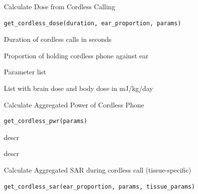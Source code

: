 \documentclass[a4paper]{book}
\begin{document}
%
\begin{Description}
Calculate Dose from Cordless Calling
\end{Description}
%
\begin{Usage}
\begin{verbatim}
get_cordless_dose(duration, ear_proportion, params)
\end{verbatim}
\end{Usage}
%
\begin{Arguments}
\begin{ldescription}
\item[\code{duration}] Duration of cordless calls in seconds

\item[\code{ear\_proportion}] Proportion of holding cordless phone against ear

\item[\code{params}] Parameter list
\end{ldescription}
\end{Arguments}
%
\begin{Value}
List with brain dose and body dose in mJ/kg/day
\end{Value}
%
\begin{Description}
Calculate Aggregated Power of Cordless Phone
\end{Description}
%
\begin{Usage}
\begin{verbatim}
get_cordless_pwr(params)
\end{verbatim}
\end{Usage}
%
\begin{Arguments}
\begin{ldescription}
\item[\code{params}] descr
\end{ldescription}
\end{Arguments}
%
\begin{Value}
descr
\end{Value}
%
\begin{Description}
Calculate Aggregated SAR during cordless call (tissue-specific)
\end{Description}
%
\begin{Usage}
\begin{verbatim}
get_cordless_sar(ear_proportion, params, tissue_params)
\end{verbatim}
\end{Usage}
\end{document}
